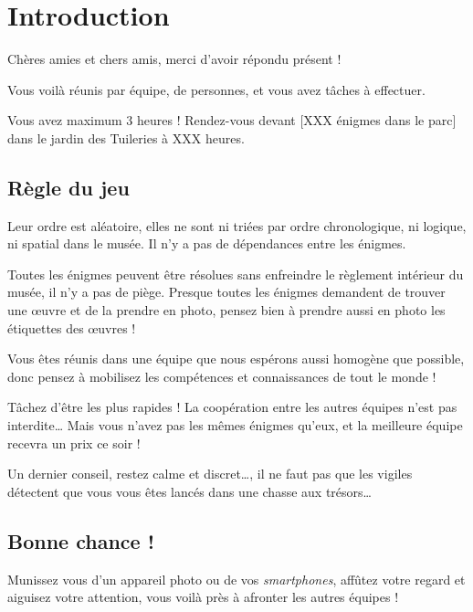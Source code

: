 \chapter{Introduction}

Chères amies et chers amis, merci d'avoir répondu présent !

Vous voilà réunis par équipe, de \nbparequipe{} personnes,
et vous avez \nbenigmes{} tâches à effectuer.

Vous avez maximum $3$ heures !
Rendez-vous devant [XXX énigmes dans le parc] dans le jardin des Tuileries à XXX heures.


\section*{Règle du jeu}

Leur ordre est aléatoire, elles ne sont ni triées par ordre chronologique, ni logique, ni spatial dans le musée. Il n'y a pas de dépendances entre les énigmes.

Toutes les énigmes peuvent être résolues sans enfreindre le règlement intérieur du musée, il n'y a pas de piège.
Presque toutes les énigmes demandent de trouver une œuvre et de la prendre en photo, pensez bien à prendre aussi en photo les étiquettes des œuvres !

Vous êtes réunis dans une équipe que nous espérons aussi homogène que possible, donc pensez à mobilisez les compétences et connaissances de tout le monde !

Tâchez d'être les plus rapides ! La coopération entre les autres équipes n'est pas interdite…
Mais vous n'avez pas les mêmes énigmes qu'eux, et la meilleure équipe recevra un prix ce soir !

Un dernier conseil, restez calme et discret…, il ne faut pas que les vigiles détectent que vous vous êtes lancés dans une chasse aux trésors…


\section*{Bonne chance !}
Munissez vous d'un appareil photo ou de vos \emph{smartphones}, affûtez votre regard et aiguisez votre attention, vous voilà près à afronter les autres équipes !

